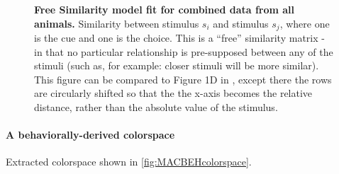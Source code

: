 \begin{figure}
    \centering
    \begin{subfigure}[b]{0.45\textwidth}
         \centering
         \caption{}
         
         \label{fig:SimilarityMatrixCombined}
    \end{subfigure}
    \hfill
    \begin{subfigure}[b]{0.45\textwidth}
         \centering
         \caption{}
         
         \label{fig:SimilarityMatrixCombinedRemapOnly}
    \end{subfigure}
    \caption{\textbf{Free Similarity model fit for combined data from all animals.}
    Similarity between stimulus $s_i$ and stimulus $s_j$, where one is the cue and one is the choice. This is a ``free'' similarity matrix - in that no particular relationship is pre-supposed between any of the stimuli (such as, for example: closer stimuli will be more similar). This figure can be compared to Figure 1D in \cite{schurgin_psychophysical_2020}, except there the rows are circularly shifted so that the the x-axis becomes the relative distance, rather than the absolute value of the stimulus. %
    } 
    \label{fig:TCCOutput}
\end{figure}

\paragraph{A behaviorally-derived colorspace}

Extracted colorspace shown in \autoref{fig:MACBEHcolorspace}.

